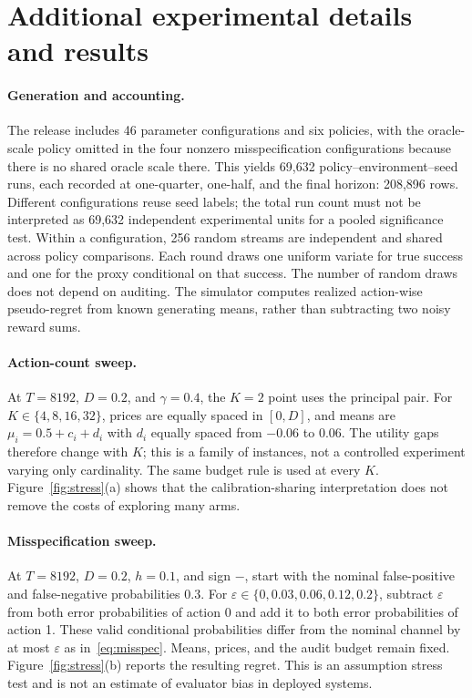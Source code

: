 

\appendix
\section{Additional experimental details and results}\label{app:experiments}
\paragraph{Generation and accounting.}
The release includes 46 parameter configurations and six policies, with the oracle-scale policy omitted in the four nonzero misspecification configurations because there is no shared oracle scale there. This yields 69,632 policy--environment--seed runs, each recorded at one-quarter, one-half, and the final horizon: 208,896 rows. Different configurations reuse seed labels; the total run count must not be interpreted as 69,632 independent experimental units for a pooled significance test. Within a configuration, 256 random streams are independent and shared across policy comparisons. Each round draws one uniform variate for true success and one for the proxy conditional on that success. The number of random draws does not depend on auditing. The simulator computes realized action-wise pseudo-regret from known generating means, rather than subtracting two noisy reward sums.

\paragraph{Action-count sweep.}
At $T=8192$, $D=0.2$, and $\gamma=0.4$, the $K=2$ point uses the principal pair. For $K\in\{4,8,16,32\}$, prices are equally spaced in $[0,D]$, and means are $\mu_i=0.5+c_i+d_i$ with $d_i$ equally spaced from $-0.06$ to $0.06$. The utility gaps therefore change with $K$; this is a family of instances, not a controlled experiment varying only cardinality. The same budget rule is used at every $K$. Figure~\ref{fig:stress}(a) shows that the calibration-sharing interpretation does not remove the costs of exploring many arms.

\paragraph{Misspecification sweep.}
At $T=8192$, $D=0.2$, $h=0.1$, and sign $-$, start with the nominal false-positive and false-negative probabilities $0.3$. For $\varepsilon\in\{0,0.03,0.06,0.12,0.2\}$, subtract $\varepsilon$ from both error probabilities of action 0 and add it to both error probabilities of action 1. These valid conditional probabilities differ from the nominal channel by at most $\varepsilon$ as in~\eqref{eq:misspec}. Means, prices, and the audit budget remain fixed. Figure~\ref{fig:stress}(b) reports the resulting regret. This is an assumption stress test and is not an estimate of evaluator bias in deployed systems.

